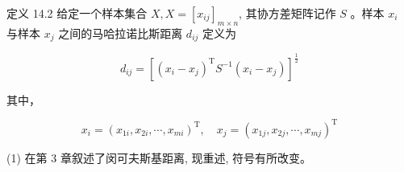 \documentclass[10pt]{article}
\begin{document}
\begin{CJK*}{UTF8}{bsmi}
定义 14.2 给定一个样本集合 $X, X=\left[x_{i j}\right]_{m \times n}$, 其协方差矩阵记作 $S$ 。样本 $x_{i}$ 与样本 $x_{j}$ 之间的马哈拉诺比斯距离 $d_{i j}$ 定义为


\begin{equation*}
d_{i j}=\left[\left(x_{i}-x_{j}\right)^{\mathrm{T}} S^{-1}\left(x_{i}-x_{j}\right)\right]^{\frac{1}{2}} \tag{14.6}
\end{equation*}


其中，


\begin{equation*}
x_{i}=\left(x_{1 i}, x_{2 i}, \cdots, x_{m i}\right)^{\mathrm{T}}, \quad x_{j}=\left(x_{1 j}, x_{2 j}, \cdots, x_{m j}\right)^{\mathrm{T}} \tag{14.7}
\end{equation*}


(1) 在第 3 章叙述了闵可夫斯基距离, 现重述, 符号有所改变。


\end{CJK*}
\end{document}
